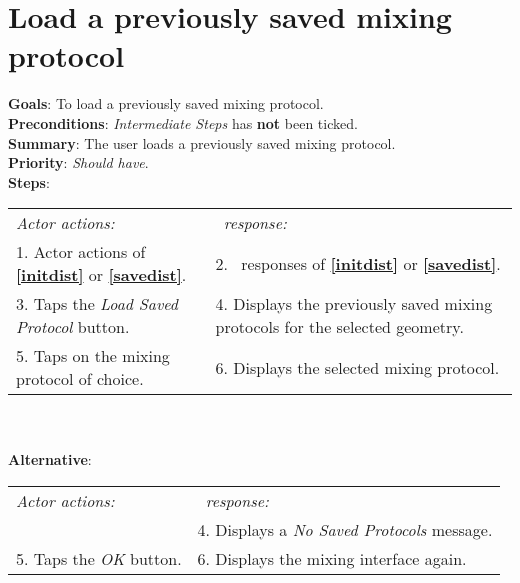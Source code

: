   \section{Load a previously saved mixing protocol}
  \label{loadsaveprot}
  \textbf{Goals}: To load a previously saved mixing protocol.\\
  \textbf{Preconditions}: \emph{Intermediate Steps} has \textbf{not} been ticked.\\
  \textbf{Summary}: The user loads a previously saved mixing protocol.\\
  \textbf{Priority}: \emph{Should have}.\\
  \textbf{Steps}: \\
  \begin{tabular}{ p{} p{} }
  	\emph{Actor actions:} & \emph{\projectname\ response:} \\
  	1. Actor actions of \textbf{\ref{initdist}} or  \textbf{\ref{savedist}}. & 2. \projectname\ responses of \textbf{\ref{initdist}} or  \textbf{\ref{savedist}}. \\
	3. Taps the \emph{Load Saved Protocol} button. & 4. Displays the previously saved mixing protocols for the selected geometry. \\
	5. Taps on the mixing protocol of choice. & 6. Displays the selected mixing protocol.\\
	\end{tabular}
	        \\
     \\\textbf{Alternative}: \\
    \begin{tabular}{ p{} p{} }
  	\emph{Actor actions:} & \emph{\projectname\ response:} \\
            & 4. Displays a \emph{No Saved Protocols} message. \\
    5. Taps the \emph{OK} button. & 6. Displays the mixing interface again. \\
  \end{tabular}

